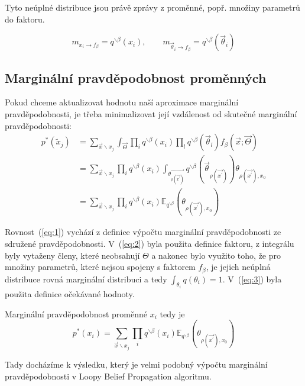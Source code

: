 Tyto neúplné distribuce jsou právě zprávy z proměnné, popř. množiny parametrů do faktoru.

$$m_{x_i \rightarrow f_\beta} = q^{\backslash \beta}(x_i), 
\quad \quad
m_{\vec\theta_i \rightarrow f_\beta} = q^{\backslash \beta}(\vec\theta_i)$$

\subsection{Marginální pravděpodobnost proměnných}

Pokud chceme aktualizovat hodnotu naší aproximace marginální pravděpodobnosti,
je třeba minimalizovat její vzdálenost od skutečné marginální
pravděpodobnosti:
\begin{align}
p^*(\tilde{x}_j) &=
\sum_{\vec{x} \backslash x_j}
	\int_{\vec{\Theta}}
    		\prod_i 
			q^{\backslash \beta}(x_i)
		\prod_l 
			q^{\backslash \beta}(\vec{\theta}_l)
		f_\beta(\vec{x};
    		  \vec{\Theta})
\label{eq:1} 
\\
&=
\sum_{\vec{x} \backslash x_j} 
	\prod_i 
		q^{\backslash \beta}(x_i)
    \int_{\vec{\theta_{\rho(\vec{x^\prime})}}}
	    q^{\backslash \beta}(\vec{\theta}_{\rho(\vec{x^\prime})})
    \theta_{\rho(\vec{x^\prime}), x_0} \label{eq:2} 
\\
&= 
\sum_{\vec{x} \backslash x_j} 
	\prod_i 
		q^{\backslash \beta}(x_i)
    		\mathbb{E}_{q^{\backslash \beta}} 
			(\theta_{\rho(\vec{x^\prime}), x_0}) 
\label{eq:3}
\end{align}

Rovnost~(\ref{eq:1}) vychází z definice výpočtu marginální pravděpodobnosti ze
sdružené pravděpodobnosti.
V~(\ref{eq:2}) byla použita definice faktoru, z integrálu byly vytaženy členy,
které neobsahují $\Theta$ a nakonec bylo využito toho, že pro
množiny parametrů, které nejsou spojeny s faktorem $f_\beta$, je jejich neúplná
distribuce rovná marginální distribuci a tedy $\int_{\theta_i} q(\theta_i) =
1$. V~(\ref{eq:3}) byla použita definice očekávané hodnoty.

Marginální pravděpodobnost proměnné $x_i$ tedy je
\begin{equation}
p^*(x_i) =
\sum_{\vec{x} \backslash x_j} 
	\prod_i 
		q^{\backslash \beta}(x_i)
    		\mathbb{E}_{q^{\backslash \beta}} 
			(\theta_{\rho(\vec{x^\prime}), x_0}) 
\end{equation}

Tady docházíme k výsledku, který je velmi podobný výpočtu marginální
pravděpodobnosti v Loopy Belief Propagation algoritmu.

